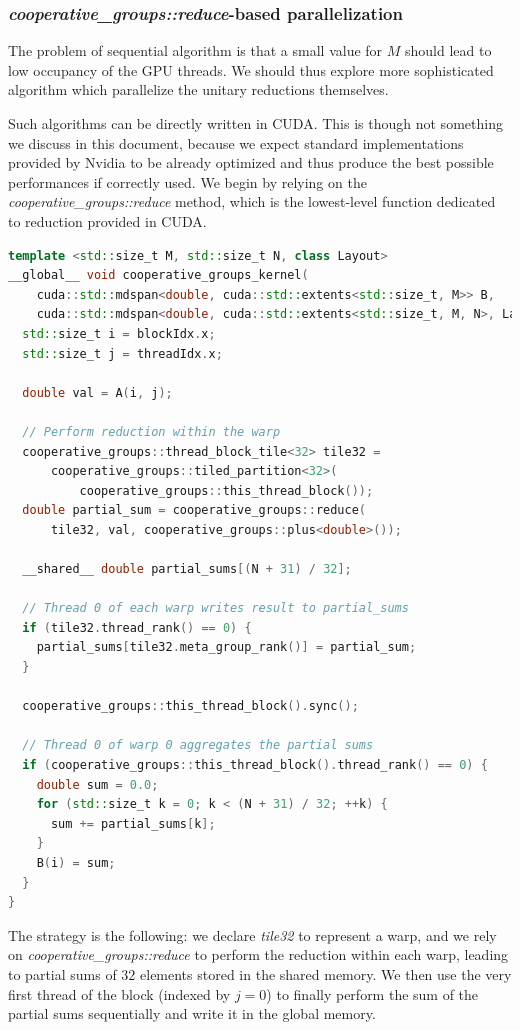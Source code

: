 \documentclass{article}
\begin{document}
\subsubsection{\textit{cooperative\_groups::reduce}-based parallelization}

The problem of sequential algorithm is that a small value for $M$ should lead to low occupancy of the GPU threads. We should thus explore more sophisticated algorithm which parallelize the unitary reductions themselves.

Such algorithms can be directly written in CUDA. This is though not something we discuss in this document, because we expect standard implementations provided by Nvidia to be already optimized and thus produce the best possible performances if correctly used. We begin by relying on the \textit{cooperative\_groups::reduce} method, which is the lowest-level function dedicated to reduction provided in CUDA.

\begin{lstlisting}[language=C++]
template <std::size_t M, std::size_t N, class Layout>
__global__ void cooperative_groups_kernel(
    cuda::std::mdspan<double, cuda::std::extents<std::size_t, M>> B,
    cuda::std::mdspan<double, cuda::std::extents<std::size_t, M, N>, Layout> A) {
  std::size_t i = blockIdx.x;
  std::size_t j = threadIdx.x;

  double val = A(i, j);

  // Perform reduction within the warp 
  cooperative_groups::thread_block_tile<32> tile32 =
      cooperative_groups::tiled_partition<32>(
          cooperative_groups::this_thread_block());
  double partial_sum = cooperative_groups::reduce(
      tile32, val, cooperative_groups::plus<double>());

  __shared__ double partial_sums[(N + 31) / 32];

  // Thread 0 of each warp writes result to partial_sums
  if (tile32.thread_rank() == 0) {
    partial_sums[tile32.meta_group_rank()] = partial_sum;
  }

  cooperative_groups::this_thread_block().sync();

  // Thread 0 of warp 0 aggregates the partial sums
  if (cooperative_groups::this_thread_block().thread_rank() == 0) {
    double sum = 0.0;
    for (std::size_t k = 0; k < (N + 31) / 32; ++k) {
      sum += partial_sums[k];
    }
    B(i) = sum;
  }
}
\end{lstlisting}

The strategy is the following: we declare \textit{tile32} to represent a warp, and we rely on \textit{cooperative\_groups::reduce} to perform the reduction within each warp, leading to partial sums of $32$ elements stored in the shared memory. We then use the very first thread of the block (indexed by $j=0$) to finally perform the sum of the partial sums sequentially and write it in the global memory.
\end{document}
